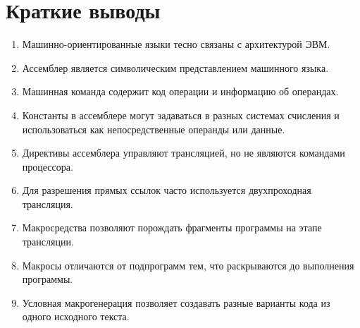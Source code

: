 \documentclass[12pt,a4paper]{article}
\begin{document}
\section{Краткие выводы}

\begin{enumerate}
    \item Машинно-ориентированные языки тесно связаны с архитектурой ЭВМ.
    \item Ассемблер является символическим представлением машинного языка.
    \item Машинная команда содержит код операции и информацию об операндах.
    \item Константы в ассемблере могут задаваться в разных системах счисления и использоваться как непосредственные операнды или данные.
    \item Директивы ассемблера управляют трансляцией, но не являются командами процессора.
    \item Для разрешения прямых ссылок часто используется двухпроходная трансляция.
    \item Макросредства позволяют порождать фрагменты программы на этапе трансляции.
    \item Макросы отличаются от подпрограмм тем, что раскрываются до выполнения программы.
    \item Условная макрогенерация позволяет создавать разные варианты кода из одного исходного текста.
\end{enumerate}
\end{document}
